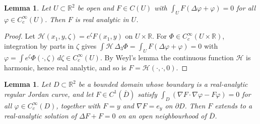 \documentclass[11pt]{amsart}
\newtheorem{lemma}[theorem]{Lemma}
\theoremstyle{definition}
\theoremstyle{remark}
\numberwithin{equation}{section}
\newcommand{\R}{\mathbb{R}}
\begin{document}
\begin{lemma}\label{lem:interior}
Let $U\subset\R^2$ be open and $F\in C(U)$ with $\int_UF(\Delta\varphi+\varphi)=0$ for all $\varphi\in C^\infty_c(U)$. Then $F$ is real analytic in $U$.
\end{lemma}

\begin{proof}
Let $\mathcal H(x_1,y,\zeta)=e^\zeta F(x_1,y)$ on $U\times\R$. For $\Phi\in C_c^\infty(U\times\R)$, integration by parts in $\zeta$ gives $\int\mathcal H\,\Delta_3\Phi=\int_UF(\Delta\varphi+\varphi)=0$ with $\varphi=\int e^\zeta\Phi(\cdot,\zeta)\,d\zeta\in C_c^\infty(U)$. By Weyl's lemma the continuous function $\mathcal H$ is harmonic, hence real analytic, and so is $F=\mathcal H(\cdot,\cdot,0)$.
\end{proof}

\begin{lemma}\label{lem:boundary}
Let $D\subset\R^2$ be a bounded domain whose boundary is a real-analytic regular Jordan curve, and let $F\in C^1(\overline D)$ satisfy $\int_D(\nabla F\cdot\nabla\varphi-F\varphi)=0$ for all $\varphi\in C_c^\infty(D)$, together with $F=y$ and $\nabla F=e_y$ on $\partial D$. Then $F$ extends to a real-analytic solution of $\Delta F+F=0$ on an open neighbourhood of $\overline D$.
\end{lemma}
\end{document}
